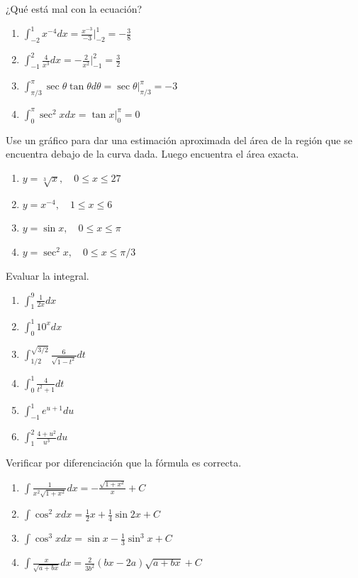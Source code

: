 \documentclass[12pt,]{article}
\begin{document}
¿Qué está mal con la ecuación?

\begin{enumerate}
\def\labelenumi{\arabic{enumi}.}
\setcounter{enumi}{32}
\item
  \(\displaystyle\int_{-2}^{1}x^{-4}dx=\frac{x^{-3}}{-3}\big|_{-2}^{1}=-\frac{3}{8}\)
\item
  \(\displaystyle\int_{-1}^{2}\frac{4}{x^3}dx=-\frac{2}{x^2}\big|_{-1}^{2}=\frac{3}{2}\)
\item
  \(\displaystyle\int_{\pi/3}^{\pi}\sec\theta\tan\theta d\theta=\sec\theta\big|_{\pi/3}^{\pi}=-3\)
\item
  \(\displaystyle\int_{0}^{\pi}\sec^2 x dx=\tan x\big|_{0}^{\pi}=0\)
\end{enumerate}

Use un gráfico para dar una estimación aproximada del área de la región
que se encuentra debajo de la curva dada. Luego encuentra el área
exacta.

\begin{enumerate}
\def\labelenumi{\arabic{enumi}.}
\setcounter{enumi}{36}
\item
  \(y=\sqrt[3]{x},\quad 0\le x \le 27\)
\item
  \(y=x^{-4},\quad 1\le x \le 6\)
\item
  \(y=\sin x,\quad 0\le x \le \pi\)
\item
  \(y=\sec^2x,\quad 0\le x \le\pi/3\)
\end{enumerate}

Evaluar la integral.

\begin{enumerate}
\def\labelenumi{\arabic{enumi}.}
\setcounter{enumi}{40}
\item
  \(\displaystyle\int_{1}^{9}\frac{1}{2x}dx\)
\item
  \(\displaystyle\int_{0}^{1}10^xdx\)
\item
  \(\displaystyle\int_{1/2}^{\sqrt{3/2}}\frac{6}{\sqrt{1-t^2}}dt\)
\item
  \(\displaystyle\int_{0}^{1}\frac{4}{t^2+1}dt\)
\item
  \(\displaystyle\int_{-1}^{1}e^{u+1}du\)
\item
  \(\displaystyle\int_{1}^{2}\frac{4+u^2}{u^3}du\)
\end{enumerate}

\newpage

Verificar por diferenciación que la fórmula es correcta.

\begin{enumerate}
\def\labelenumi{\arabic{enumi}.}
\item
  \(\displaystyle\int\frac{1}{x^2\sqrt{1+x^2}}dx=-\frac{\sqrt{1+x^2}}{x}+C\)
\item
  \(\displaystyle\int\cos^2xdx=\frac{1}{2}x+\frac{1}{4}\sin 2x+C\)
\item
  \(\displaystyle\int\cos^3xdx= \sin x-\frac{1}{3}\sin^3x+C\)
\item
  \(\displaystyle\int\frac{x}{\sqrt{a+bx}}dx=\frac{2}{3b^2}(bx-2a)\sqrt{a+bx}+C\)
\end{enumerate}
\end{document}
